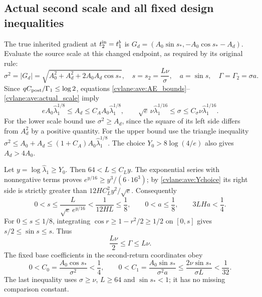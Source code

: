 \subsection{Actual second scale and all fixed design inequalities}

The true inherited gradient at $t_2^{\rm in}=t_1^b$ is
$G_d=(A_0\sin s_*,-A_0\cos s_*-A_d)$. Evaluate the source scale
at this changed endpoint, as required by its original rule:
\begin{equation}\label{cvlane:ave:actual_scale}
 \sigma^2=|G_d|
   =\sqrt{A_0^2+A_d^2+2A_0A_d\cos s_*},\quad
 s=s_2=\frac{L\nu}{\sigma},\quad a=\sin s,\quad
 \Gamma=\Gamma_2=\sigma a.
\end{equation}
Since $qC_{\rm post}/\Gamma_1\leq\log2$, equations
\eqref{cvlane:ave:AE_bounds}--\eqref{cvlane:ave:actual_scale} imply
\begin{equation}\label{cvlane:ave:scale_bounds}
 eA_0\widehat\lambda_1^{1/8}\leq A_d\leq
 C_A A_0\widehat\lambda_1^{1/8},\qquad
 \sqrt e\,\nu\widehat\lambda_1^{1/16}\leq\sigma
       \leq C_\sigma\nu\widehat\lambda_1^{1/16}.
\end{equation}
For the lower scale bound use $\sigma^2\geq A_d$, since the square
of its left side differs from $A_d^2$ by a positive quantity.
For the upper bound use the triangle inequality
$\sigma^2\leq A_0+A_d\leq(1+C_A)A_0\widehat\lambda_1^{1/8}$.
The choice $Y_0>8\log(4/e)$ also gives $A_d>4A_0$.

Let $y=\log\widehat\lambda_1\geq Y_0$.
Then $64<L\leq C_Ly$. The exponential series with nonnegative
terms proves $e^{y/16}\geq y^3/(6\cdot16^3)$; by
\eqref{cvlane:ave:Ychoice} its right side is strictly greater than
$12HC_L^2y^2/\sqrt e$. Consequently
\begin{equation}\label{cvlane:ave:angle_bounds}
 0<s\leq\frac{L}{\sqrt e\,e^{y/16}}
      <\frac1{12HL}\leq\frac18,
 \qquad 0<a\leq\frac18,
 \qquad 3LHa<\frac14.
\end{equation}
For $0\leq s\leq1/8$, integrating $\cos r\geq1-r^2/2\geq1/2$
on $[0,s]$ gives $s/2\leq\sin s\leq s$. Thus
\begin{equation}\label{cvlane:ave:Gamma_bounds}
 \frac{L\nu}{2}\leq\Gamma\leq L\nu.
\end{equation}
The fixed base coefficients in the second-return coordinates obey
\begin{equation}\label{cvlane:ave:C_bounds}
 0<C_0=\frac{A_0\cos s_*}{\sigma^2}<\frac14,
 \qquad 0<C_1=\frac{A_0\sin s_*}{\sigma^2a}
 \leq\frac{2\nu\sin s_*}{\sigma L}<\frac1{32}.
\end{equation}
The last inequality uses $\sigma\geq\nu$, $L\geq64$ and
$\sin s_*<1$; it has no missing comparison constant.

